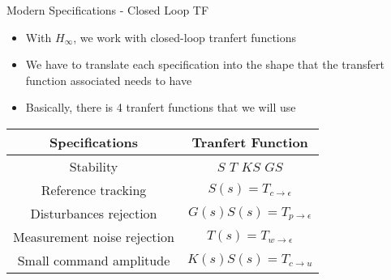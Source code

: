 \documentclass[../main/main.tex]{subfiles}
\begin{document}
\begin{frame}{Modern Specifications - Closed Loop TF}
  \centering
  \begin{itemize}
  \item With \(H_{\infty}\), we work with closed-loop tranfert functions
  \item We have to translate each specification into the shape that the
    transfert function associated needs to have
  \item Basically, there is 4 tranfert functions that we will use
  \end{itemize}

  \begin{tabular}{| c | c |}
            \hline
            \textbf{Specifications}     & \textbf{Tranfert Function}         \\ \hline
            Stability                   & \(S\) \(T\) \(KS\) \(GS\)                  \\ \hline
            Reference tracking          & \(S(s) = T_{c \rightarrow \epsilon}\)      \\ \hline
            Disturbances rejection      & \(G(s) S(s) = T_{p \rightarrow \epsilon}\) \\ \hline
            Measurement noise rejection & \(T(s) = T_{w \rightarrow \epsilon}\)      \\ \hline
            Small command amplitude     & \(K(s) S(s) = T_{c \rightarrow u}\)      \\ \hline
  \end{tabular}
\end{frame}
\end{document}
